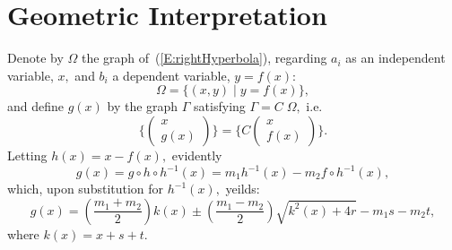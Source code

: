 \documentclass{amsart}
\begin{document}
\section{Geometric Interpretation}
Denote by $\Omega$ the
graph of~(\ref{E:rightHyperbola}),
regarding $a_i$ as an independent variable, $x,$ and $b_i$
a dependent variable, $y = f(x):$
\[
\Omega = \{(x, y) \mid y = f(x)\},
\]
and define $g(x)$ by the graph $\Gamma$ satisfying $\Gamma =  C \;
\Omega,$ i.e.
\[
  \{
  \begin{pmatrix}
    x\\
    g(x)
  \end{pmatrix}
  \}
  =
  \{
  C
  \begin{pmatrix}
    x\\
    f(x)
  \end{pmatrix}
  \} .
\]
Letting $h(x) = x - f(x),$ evidently
\[
g(x) = g \circ h \circ h^{-1}(x) = m_1 h^{-1}(x) - m_2 f \circ h^{-1}(x),
\]
which, upon substitution for $h^{-1}(x),$ yeilds:
\[
  g(x) = (\frac{m_1 + m_2}{2}) k(x) \pm
  (\frac{m_1 - m_2}{2}) \sqrt{k^2(x) + 4 r} - m_1 s - m_2 t,
\]
where $k(x) = x + s + t.$
\end{document}
